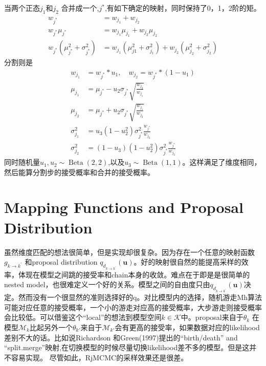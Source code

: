 \documentclass[
]{book}
\theoremstyle{definition}
\theoremstyle{definition}
\theoremstyle{definition}
\theoremstyle{remark}
\begin{document}
当两个正态\(j_1\)和\(j_2\) 合并成一个,\(j^*\),有如下确定的映射，同时保持了0，1，2阶的矩。
\[
\begin{aligned} w_{j^{*}} &=w_{j_{1}}+w_{j_{2}} \\ w_{j^{*}} \mu_{j^{*}} &=w_{j_{1}} \mu_{j_{1}}+w_{j_{2}} \mu_{j_{2}} \\ w_{j^{*}}\left(\mu_{j^{*}}^{2}+\sigma_{j^{*}}^{2}\right) &=w_{j_{1}}\left(\mu_{j 1}^{2}+\sigma_{j_{1}}^{2}\right)+w_{j_{2}}\left(\mu_{j_{2}}^{2}+\sigma_{j_{2}}^{2}\right) \end{aligned}
\]
分割则是
\[
\begin{aligned} w_{j_{1}} &=w_{j^{*}} * u_{1}, \quad w_{j_{2}}=w_{j^{*}} *\left(1-u_{1}\right) \\ \mu_{j_{1}} &=\mu_{j^{*}}-u_{2} \sigma_{j^{*}} \sqrt{\frac{w_{j_{2}}}{w_{j_{1}}}} \\ \mu_{j_{2}} &=\mu_{j^{*}}+u_{2} \sigma_{j^{*}} \sqrt{\frac{w_{j_{1}}}{w_{j_{2}}}} \\ \sigma_{j_{1}}^{2} &=u_{3}\left(1-u_{2}^{2}\right) \sigma_{j^{*}}^{2} \frac{w_{j^{*}}}{w_{j_{2}}} \\ \sigma_{j_{2}}^{2} &=\left(1-u_{3}\right)\left(1-u_{2}^{2}\right) \sigma_{j^{*}}^{2} \frac{w_{j^{*}}}{w_{j_{2}}} \end{aligned}
\]
同时随机量\(u_{1}, u_{2} \sim \operatorname{Beta}(2,2)\),以及\(u_{3} \sim \operatorname{Beta}(1,1)\)。这样满足了维度相同，然后能算分割步的接受概率和合并的接受概率。

\hypertarget{mapping-functions-and-proposal-distribution}{%
\section{Mapping Functions and Proposal Distribution}\label{mapping-functions-and-proposal-distribution}}

虽然维度匹配的想法很简单，但是实现却很复杂。因为存在一个任意的映射函数\(g_{k \rightarrow k^{\prime}}\) 和proposal distribution \(q_{d_{k \rightarrow k^{\prime}}}(\mathbf{u})\)。好的映射很自然的能提高采样的效率，体现在模型之间跳的接受率和chain本身的收敛。难点在于即是是很简单的nested model，也很难定义一个好的关系。模型之间的自由度只由\(q_{d_{k \rightarrow k^{\prime}}}(\mathbf{u})\)决定。然而没有一个很显然的准则选择好的q。对比模型内的选择，随机游走Mh算法可能对应任意的接受概率，一个小的游走对应高的接受概率，大步游走则接受概率会比较低。可以借鉴这个``local''的想法到模型空间\(k\in\mathcal K\)中。proposal来自于\(\theta_k\) 在模型\(\mathcal M_k\)比起另外一个\(\theta_{k'}\)来自于\(\mathcal M_{k'}\)会有更高的接受率，如果数据对应的likelihood差别不大的话。比如说Richardson 和Green(1997)提出的``birth/death'' and ``split.merge''映射,在切换模型的时候尽量切换likelihood差不多的模型。但是这并不容易实现。
尽管如此，RjMCMC的采样效果还是很差。
\end{document}

